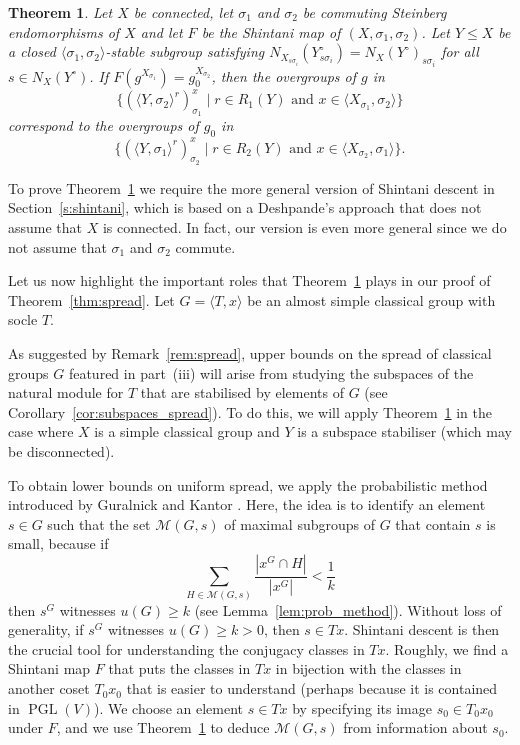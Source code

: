 \documentclass[11pt]{article}
\numberwithin{equation}{section}
\theoremstyle{shdefinition}
\theoremstyle{shplain}
\newtheorem{shtheorem}[shdefinition]{Theorem}
\newcommand{\s}{\sigma}
\newcommand{\M}{\mathcal{M}}
\newcommand{\<}{\langle}
\renewcommand{\>}{\rangle}
\renewcommand{\leq}{\leqslant}
\renewcommand{\geq}{\geqslant}
\renewcommand{\:}{\colon}
\newcommand{\PGL}{\operatorname{PGL}}
\begin{document}
\begin{shtheorem} \label{thm:shintani_subgroups}
Let $X$ be connected, let $\s_1$ and $\s_2$ be commuting Steinberg endomorphisms of $X$ and let $F$ be the Shintani map of $(X,\s_1,\s_2)$. Let $Y \leq X$ be a closed $\<\s_1,\s_2\>$-stable subgroup satisfying $N_{X_{s\s_i}}(Y^\circ_{s\s_i}) = N_X(Y^\circ)_{s\s_i}$ for all $s \in N_X(Y^\circ)$. If $F(g^{X_{\s_1}}) = g_0^{X_{\s_2}}$, then the overgroups of $g$ in
\[
\{ (\<Y,\s_2\>^r)_{\s_1}^x \mid \text{$r \in R_1(Y)$ and $x \in \<X_{\s_1},\s_2\>$} \}
\]
correspond to the overgroups of $g_0$ in
\[
\{ (\<Y,\s_1\>^r)_{\s_2}^x \mid \text{$r \in R_2(Y)$ and $x \in \<X_{\s_2},\s_1\>$} \}.
\]
\end{shtheorem}

To prove Theorem~\ref{thm:shintani_subgroups} we require the more general version of Shintani descent in Section~\ref{s:shintani}, which is based on a Deshpande's approach \cite{ref:Deshpande16} that does not assume that $X$ is connected. In fact, our version is even more general since we do not assume that $\s_1$ and $\s_2$ commute.

Let us now highlight the important roles that Theorem~\ref{thm:shintani_subgroups} plays in our proof of Theorem~\ref{thm:spread}. Let $G = \<T,x\>$ be an almost simple classical group with socle $T$.

As suggested by Remark~\ref{rem:spread}, upper bounds on the spread of classical groups $G$ featured in part~(iii) will arise from studying the subspaces of the natural module for $T$ that are stabilised by elements of $G$ (see Corollary~\ref{cor:subspaces_spread}). To do this, we will apply Theorem~\ref{thm:shintani_subgroups} in the case where $X$ is a simple classical group and $Y$ is a subspace stabiliser (which may be disconnected).

To obtain lower bounds on uniform spread, we apply the probabilistic method introduced by Guralnick and Kantor \cite{ref:GuralnickKantor00}. Here, the idea is to identify an element $s \in G$ such that the set $\M(G,s)$ of maximal subgroups of $G$ that contain $s$ is small, because if
\[
\sum_{H \in \M(G,s)} \frac{|x^G \cap H|}{|x^G|} < \frac{1}{k}
\]
then $s^G$ witnesses $u(G) \geq k$ (see Lemma~\ref{lem:prob_method}). Without loss of generality, if $s^G$ witnesses $u(G) \geq k > 0$, then $s \in Tx$. Shintani descent is then the crucial tool for understanding the conjugacy classes in $Tx$. Roughly, we find a Shintani map $F$ that puts the classes in $Tx$ in bijection with the classes in another coset $T_0x_0$ that is easier to understand (perhaps because it is contained in $\PGL(V)$). We choose an element $s \in Tx$ by specifying its image $s_0 \in T_0x_0$ under $F$, and we use Theorem~\ref{thm:shintani_subgroups} to deduce $\M(G,s)$ from information about $s_0$.
\end{document}
